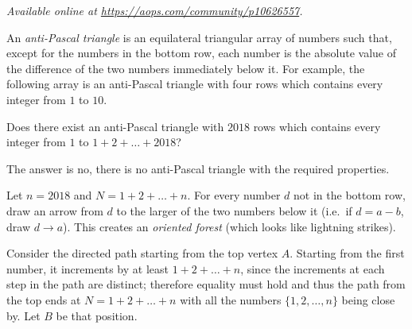\textsl{Available online at \url{https://aops.com/community/p10626557}.}
\begin{mdframed}[style=mdpurplebox,frametitle={Problem statement}]
An \emph{anti-Pascal triangle} is an equilateral triangular array
of numbers such that, except for the numbers in the bottom row,
each number is the absolute value of the difference
of the two numbers immediately below it.
For example, the following array is an anti-Pascal triangle
with four rows which contains every integer from $1$ to $10$.
\begin{center}
\end{center}
Does there exist an anti-Pascal triangle with $2018$ rows
which contains every integer from $1$ to $1+2+\dots +2018$?
\end{mdframed}
The answer is no, there is no anti-Pascal triangle
with the required properties.

Let $n = 2018$ and $N = 1+2+\dots+n$.
For every number $d$ not in the bottom row,
draw an arrow from $d$ to the larger of the two numbers below it
(i.e.\ if $d=a-b$, draw $d \to a$).
This creates an \emph{oriented forest} (which looks like lightning strikes).

Consider the directed path starting from the top vertex $A$.
Starting from the first number, it increments by at least $1+2+\dots+n$,
since the increments at each step in the path are distinct;
therefore equality must hold
and thus the path from the top ends at $N = 1+2+\dots+n$
with all the numbers $\{1,2,\dots,n\}$ being close by.
Let $B$ be that position.

